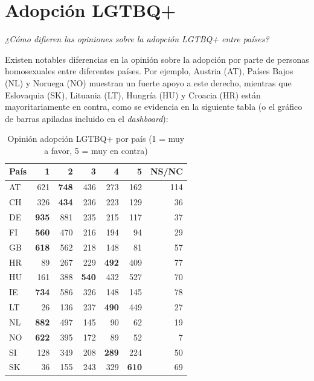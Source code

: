 \documentclass{article}
\begin{document}
\section{Adopción LGTBQ+}

\begin{center}
\emph{¿Cómo difieren las opiniones sobre la adopción LGTBQ+ entre países?}
\end{center}

Existen notables diferencias en la opinión sobre la adopción por parte de personas homosexuales entre diferentes países. Por ejemplo, Austria (AT), Países Bajos (NL) y Noruega (NO) muestran un fuerte apoyo a este derecho, mientras que Eslovaquia (SK), Lituania (LT), Hungría (HU) y Croacia (HR) están mayoritariamente en contra, como se evidencia en la siguiente tabla (o el gráfico de barras apiladas incluido en el \emph{dashboard}):

\begin{table}[h!]
\centering
\caption{Opinión adopción LGTBQ+ por país (1 = muy a favor, 5 = muy en contra)}
\begin{tabular}{lrrrrrr}
\toprule
\textbf{País} & \textbf{1} & \textbf{2} & \textbf{3} & \textbf{4} & \textbf{5} & \textbf{NS/NC} \\
\midrule
AT & 621 & \textbf{748} & 436 & 273 & 162 & 114 \\
CH & 326 & \textbf{434} & 236 & 223 & 129 & 36 \\
DE & \textbf{935} & 881 & 235 & 215 & 117 & 37 \\
FI & \textbf{560} & 470 & 216 & 194 & 94 & 29 \\
GB & \textbf{618} & 562 & 218 & 148 & 81 & 57 \\
HR & 89 & 267 & 229 & \textbf{492} & 409 & 77 \\
HU & 161 & 388 & \textbf{540} & 432 & 527 & 70 \\
IE & \textbf{734} & 586 & 326 & 148 & 145 & 78 \\
LT & 26 & 136 & 237 & \textbf{490} & 449 & 27 \\
NL & \textbf{882} & 497 & 145 & 90 & 62 & 19 \\
NO & \textbf{622} & 395 & 172 & 89 & 52 & 7 \\
SI & 128 & 349 & 208 & \textbf{289} & 224 & 50 \\
SK & 36 & 155 & 243 & 329 & \textbf{610} & 69 \\
\bottomrule
\end{tabular}
\end{table}
\end{document}
